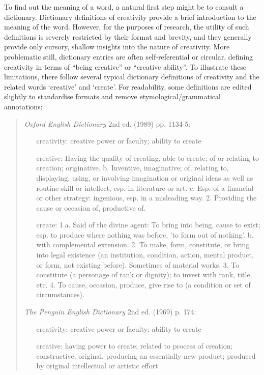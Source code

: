 \documentclass[10pt,letterpaper]{article}
\begin{document}
To find out the meaning of a word, a natural first step might be to consult a dictionary. Dictionary definitions of creativity provide a brief introduction to  the meaning of the word. However, for the purposes of research, the utility of such definitions is severely restricted by their format and brevity, and they generally provide only cursory, shallow insights into the nature of creativity. More problematic still, dictionary entries are often self-referential or circular,  defining creativity in terms of ``being creative'' or ``creative ability''. To illustrate these limitations, there follow several typical dictionary definitions of creativity and the related words `creative' and `create'. For readability, some definitions are edited slightly to standardise formats and remove etymological/grammatical annotations:
\begin{quotation}
\begin{description}
\item {\em Oxford English Dictionary} 2nd ed. (1989) pp. 1134-5:
	\begin{enumerate}
	\item[creativity:] creative power or faculty; ability to create
	\item [creative:] Having the quality of creating, able to create; of or relating to creation; originative. b. Inventive, imaginative; of, relating to, displaying, using, or involving imagination or original ideas as well as routine skill or intellect, esp. in literature or art. c. Esp. of a financial or other strategy: ingenious, esp. in a misleading way. 2. Providing the cause or occasion of, productive of.
\item [create:] 1.a. Said of the divine agent: To bring into being, cause to exist; esp. to produce where nothing was before, 'to form out of nothing'. b. with complemental extension. 2. To make, form, constitute, or bring into legal existence (an institution, condition, action, mental product, or form, not existing before). Sometimes of material works. 3. To constitute (a personage of rank or dignity); to invest with rank, title, etc. 4. To cause, occasion, produce, give rise to (a condition or set of circumstances).
	\end{enumerate}
\item {\em The Penguin English Dictionary} 2nd ed. (1969) p. 174:
	\begin{enumerate}
	\item[creativity:] creative power or faculty; ability to create
	\item[creative:] having power to create; related to process of creation; constructive, original, producing an essentially new product; produced by original intellectual or artistic effort 

\end{enumerate}
\end{description}
\end{quotation}
\end{document}
